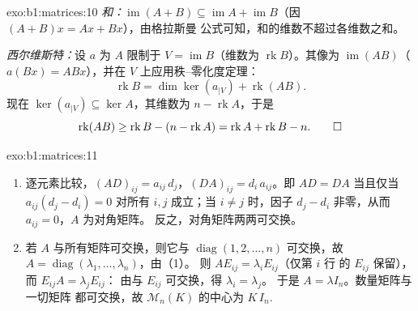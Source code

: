 \begin{solution}{exo:b1:matrices:10}
\emph{和：}$\operatorname{im}(A + B) \subseteq \operatorname{im} A
+ \operatorname{im} B$（因 $(A+B)x = Ax + Bx$），由格拉斯曼
公式可知，和的维数不超过各维数之和。

\emph{西尔维斯特：}设 $a$ 为 $A$ 限制于 $V =
\operatorname{im} B$（维数为 $\operatorname{rk} B$）。其像为
$\operatorname{im}(AB)$（$a(Bx) = ABx$），并在 $V$ 上应用秩--零化度定理：
\[
\operatorname{rk} B = \dim\ker(a_{|V}) + \operatorname{rk}(AB) .
\]
现在 $\ker(a_{|V}) \subseteq \ker A$，其维数为 $n -
\operatorname{rk} A$，于是
\[
\operatorname{rk}(AB) \geq \operatorname{rk} B - (n -
\operatorname{rk} A) = \operatorname{rk} A + \operatorname{rk} B -
n . \qedhere
\]
\end{solution}

\begin{solution}{exo:b1:matrices:11}
\begin{enumerate}
  \item 逐元素比较，$(AD)_{ij} = a_{ij}\,d_j$，$(DA)_{ij} =
        d_i\,a_{ij}$。即 $AD = DA$ 当且仅当 $a_{ij}(d_j - d_i) = 0$
        对所有 $i, j$ 成立；当 $i \neq j$ 时，因子 $d_j - d_i$
        非零，从而 $a_{ij} = 0$，$A$ 为对角矩阵。
        反之，对角矩阵两两可交换。
  \item 若 $A$ 与所有矩阵可交换，则它与
        $\operatorname{diag}(1, 2, \dots, n)$ 可交换，故 $A =
        \operatorname{diag}(\lambda_1, \dots, \lambda_n)$，由（1）。
        则 $A E_{ij} = \lambda_i E_{ij}$（仅第 $i$ 行
        的 $E_{ij}$ 保留），而 $E_{ij} A = \lambda_j E_{ij}$：
        由与 $E_{ij}$ 可交换，得 $\lambda_i = \lambda_j$。
        于是 $A = \lambda I_n$。数量矩阵与一切矩阵
        都可交换，故 $\mathcal{M}_n(K)$ 的中心为
        $K\,I_n$.
\end{enumerate}
\end{solution}

